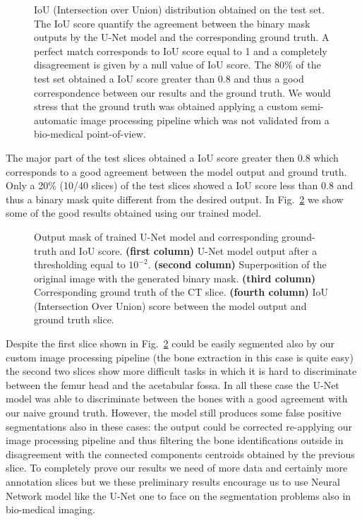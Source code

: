 \documentclass{standalone}
\begin{document}
\begin{figure}[htbp]
\centering
\def\svgwidth{0.85\textwidth}

\caption{IoU (Intersection over Union) distribution obtained on the test set.
The IoU score quantify the agreement between the binary mask outputs by the U-Net model and the corresponding ground truth.
A perfect match corresponds to IoU score equal to 1 and a completely disagreement is given by a null value of IoU score.
The 80\% of the test set obtained a IoU score greater than 0.8 and thus a good correspondence between our results and the ground truth.
We would stress that the ground truth was obtained applying a custom semi-automatic image processing pipeline which was not validated from a bio-medical point-of-view.
}
\label{fig:seg_iou}
\end{figure}

The major part of the test slices obtained a IoU score greater then 0.8 which corresponds to a good agreement between the model output and ground truth.
Only a 20\% (10/40 slices) of the test slices showed a IoU score less than 0.8 and thus a binary mask quite different from the desired output.
In Fig.~\ref{fig:seg_res} we show some of the good results obtained using our trained model.

\begin{figure}[htbp]
\centering
\def\svgwidth{\textwidth}

\caption{Output mask of trained U-Net model and corresponding ground-truth and IoU score.
\textbf{(first column)} U-Net model output after a thresholding equal to $10^{-2}$.
\textbf{(second column)} Superposition of the original image with the generated binary mask.
\textbf{(third column)} Corresponding ground truth of the CT slice.
\textbf{(fourth column)} IoU (Intersection Over Union) score between the model output and ground truth slice.
}
\label{fig:seg_res}
\end{figure}

Despite the first slice shown in Fig.~\ref{fig:seg_res} could be easily segmented also by our custom image processing pipeline (the bone extraction in this case is quite easy) the second two slices show more difficult tasks in which it is hard to discriminate between the femur head and the acetabular fossa.
In all these case the U-Net model was able to discriminate between the bones with a good agreement with our naive ground truth.
However, the model still produces some false positive segmentations also in these cases: the output could be corrected re-applying our image processing pipeline and thus filtering the bone identifications outside in disagreement with the connected components centroids obtained by the previous slice.
To completely prove our results we need of more data and certainly more annotation slices but we these preliminary results encourage us to use Neural Network model like the U-Net one to face on the segmentation problems also in bio-medical imaging.
\end{document}
